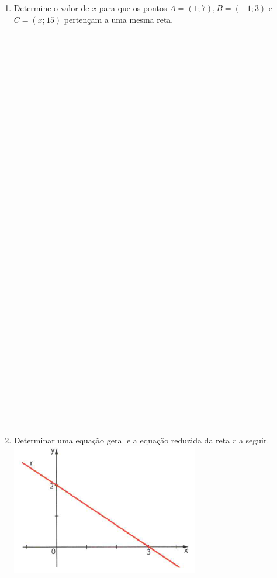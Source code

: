 \documentclass[a4paper,14pt]{article}
\begin{document}
\begin{multicols}{2}
\begin{enumerate}
			\item Determine o valor de $x$ para que os pontos $A = (1; 7), B = (-1; 3)$ e $C = (x; 15)$ pertençam a uma mesma reta. \\\\\\\\\\\\\\\\\\\\\\\\\\\\\\\\\\\\\\\\\\\\\\\\\\\\\\\\\\\\\\\\\\\\\\\\
			\item Determinar uma equação geral e a equação reduzida da reta $r$ a seguir. \\
			\includegraphics[width=1\linewidth]{8FMA111_imagens/imagem2}

\end{enumerate}
\end{multicols}
\end{document}
